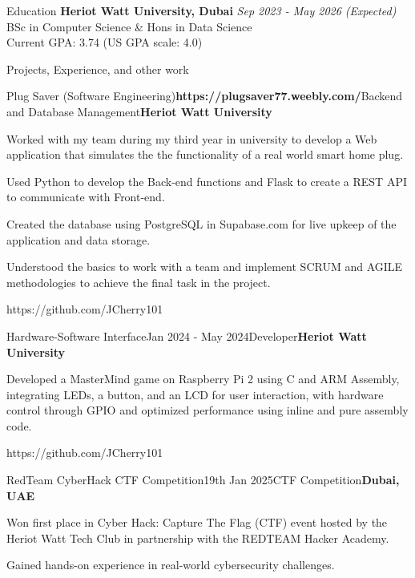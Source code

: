 \documentclass{resume}
\begin{document}
  \begin{rSection}{Education}
    {\bf Heriot Watt University, Dubai} \hfill {\em Sep 2023 - May 2026 (Expected)} \\ 
    { BSc in Computer Science \& Hons in Data Science} \smallskip \\ 
    Current GPA: 3.74 (US GPA scale: 4.0)
  \end{rSection}
  
  \begin{rSection}{Projects, Experience, and other work}
  
    \begin{rSubsection}{Plug Saver (Software Engineering)}{\textbf{https://plugsaver77.weebly.com/}}{Backend and Database Management}{\textbf{Heriot Watt University}}
    \item Worked with my team during my third year in university to develop a Web application that simulates the the functionality of a real world smart home plug.
    \item Used Python to develop the Back-end functions and Flask to create a REST API to communicate with Front-end.
    \item Created the database using PostgreSQL in Supabase.com for live upkeep of the application and data storage.
    \item Understood the basics to work with a team and implement SCRUM and AGILE methodologies to achieve the final task in the project.
    \item https://github.com/JCherry101
    \end{rSubsection}
  
    \begin{rSubsection}{Hardware-Software Interface}{Jan 2024 - May 2024}{Developer}{\textbf{Heriot Watt University}}
    \item Developed a MasterMind game on Raspberry Pi 2 using C and ARM Assembly, integrating LEDs, a button, and an LCD for user interaction, with hardware control through GPIO and optimized performance using inline and pure assembly code.
    \item https://github.com/JCherry101
    \end{rSubsection}

    \begin{rSubsection}{RedTeam CyberHack CTF Competition}{19th Jan 2025}{CTF Competition}{\textbf{Dubai, UAE}}
    \item Won first place in Cyber Hack: Capture The Flag (CTF) event hosted by the Heriot Watt Tech Club in partnership with the REDTEAM Hacker Academy.
    \item Gained hands-on experience in real-world cybersecurity challenges.
    \end{rSubsection}


\end{rSection}
\end{document}
